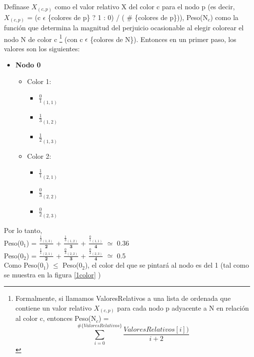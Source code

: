 Defínase  ${X}_{(c,p)}$ como el valor relativo X del color c para el nodo p (es decir, ${X}_{(c,p)}$ =  (c $\epsilon$ \{colores de p\} ? 1 : 0) / ( \# \{colores de p\})), Peso(N$_{c}$) como la función que determina la magnitud del perjuicio ocasionable al elegir colorear el nodo N de color c 
\footnote{Formalmente, si llamamos ValoresRelativos a una lista de ordenada que contiene un valor relativo ${X}_{(c,p)}$ para cada nodo p adyacente a N en relación al color c, entonces Peso(N$_{c}$) = \[
\sum_{i=0}^{\# \{ ValoresRelativos \}} \frac{ValoresRelativos[i])}{i+2}
\] }
 (con c $\epsilon$ \{colores de N\}). Entonces en un primer paso, los valores son los siguientes: 




\begin{itemize}
	\item \textbf{Nodo 0}
	\begin{itemize}
		\item Color 1:
		\begin{itemize}
			\item  $\frac{0}{1}_{(1,1)}$
			\item  $\frac{1}{3}_{(1,2)}$
			\item  $\frac{1}{2}_{(1,3)}$
		\end{itemize}

		\item Color 2:
		\begin{itemize}
			\item  $\frac{1}{1}_{(2,1)}$
			\item  $\frac{0}{3}_{(2,2)}$
			\item  $\frac{0}{2}_{(2,3)}$
		\end{itemize}
	\end{itemize}
\end{itemize}

Por lo tanto, \\
Peso(0$_{1}$) =  $\frac{ \frac{1}{2}_{(1,3)}}{\textbf{2}}$ + $\frac{\frac{1}{3}_{(1,2)}}{\textbf{3}}$ + $\frac{\frac{0}{1}_{(1,1)}}{\textbf{4}}$ $\simeq$ 0.36 \\
Peso(0$_{2}$) =  $\frac{\frac{1}{1}_{(2,1)}}{\textbf{2}}$ + $\frac{\frac{0}{3}_{(2,2)}}{\textbf{3}}$ + $\frac{\frac{0}{2}_{(2,3)}}{\textbf{4}}$ $\simeq$  0.5 \\
\newline
Como Peso(0$_{1}$) $\leq$  Peso(0$_{2}$), el color del que se pintará al nodo es del 1 (tal como se muestra en la \newline 
figura \ref{1color} )

